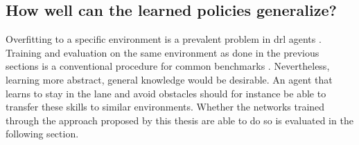 \subsection{How well can the learned policies generalize?}\label{ssec:eval_of_generalization}
Overfitting to a specific environment is a prevalent problem in \gls{drl} agents \cite{cobbeQuantifyingGeneralizationReinforcement}. Training and evaluation on the same environment as done in the previous sections is a conventional procedure for common benchmarks \cite{cobbeQuantifyingGeneralizationReinforcement, brockmanOpenAIGym2016}. Nevertheless, learning more abstract, general knowledge would be desirable. An agent that learns to stay in the lane and avoid obstacles should for instance be able to transfer these skills to similar environments. Whether the networks trained through the approach proposed by this thesis are able to do so is evaluated in the following section.

